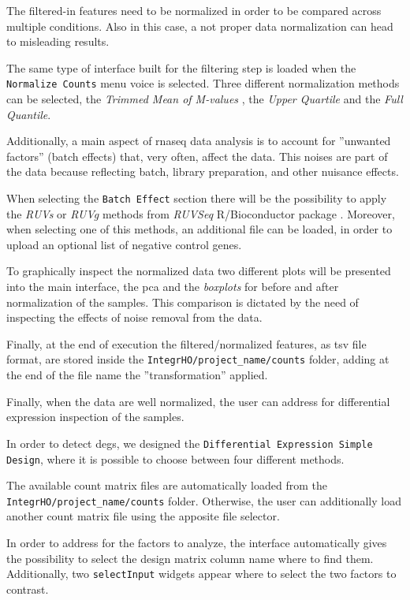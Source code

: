 The filtered-in features need to be normalized in order to be compared across multiple conditions.
Also in this case, a not proper data normalization can head to misleading results.

The same type of interface built for the filtering step is loaded when the \lstinline!Normalize Counts! menu voice is selected.
Three different normalization methods can be selected, the \textit{Trimmed Mean of M-values} \cite{Robinson2010}, the \textit{Upper Quartile} and the \textit{Full Quantile}.

Additionally, a main aspect of \gls{rnaseq} data analysis is to account for ''unwanted factors'' (batch effects) that, very often, affect the data.
This noises are part of the data because reflecting batch, library preparation, and other nuisance effects.

When selecting the \lstinline!Batch Effect! section there will be the possibility to apply the \textit{RUVs} or \textit{RUVg} methods from \textit{RUVSeq} R/Bioconductor package \cite{Risso2014h}.
Moreover, when selecting one of this methods, an additional file can be loaded, in order to upload an optional list of negative control genes.

To graphically inspect the normalized data two different plots will be presented into the main interface, the \gls{pca} and the \textit{boxplots} for before and after normalization of the samples.
This comparison is dictated by the need of inspecting the effects of noise removal from the data.

Finally, at the end of execution the filtered/normalized features, as \gls{tsv} file format, are stored inside the \lstinline!IntegrHO/project_name/counts! folder, adding at the end of the file name the ''transformation'' applied.



Finally, when the data are well normalized, the user can address for differential expression inspection of the samples.

In order to detect \glspl{deg}, we designed the \lstinline!Differential Expression Simple Design!, where it is possible to choose between four different methods.

The available count matrix files are automatically loaded from the \lstinline!IntegrHO/project_name/counts! folder.
Otherwise, the user can additionally load another count matrix file using the apposite file selector.

In order to address for the factors to analyze, the interface automatically gives the possibility to select the design matrix column name where to find them.
Additionally, two \lstinline!selectInput! widgets appear where to select the two factors to contrast.


